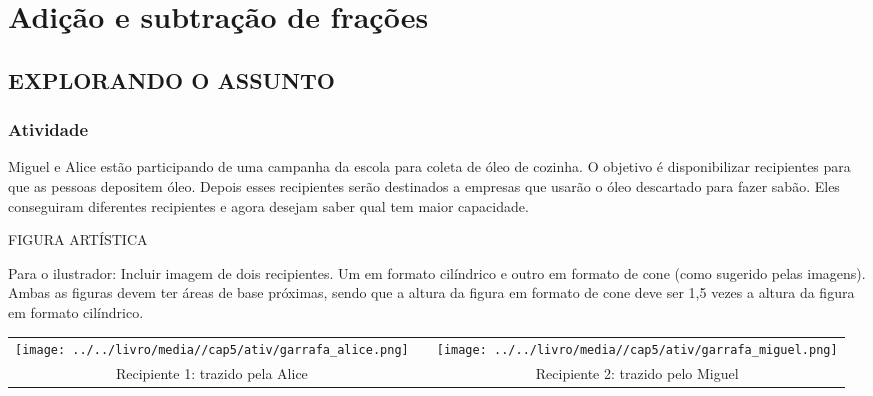 
\setcounter{chapter}{4}
\chapter{Adição e subtração de frações }

\section{EXPLORANDO O ASSUNTO }

\setcounter{subsection}{0}
\subsection{Atividade}


Miguel e Alice estão participando de uma campanha da escola para coleta de óleo de cozinha. O objetivo é disponibilizar recipientes para que as pessoas depositem óleo. Depois esses recipientes serão destinados a empresas que usarão o óleo descartado para fazer sabão. Eles conseguiram diferentes recipientes e agora desejam saber qual tem maior capacidade.

\begin{imagem*}[breakable]{}{}  

FIGURA ARTÍSTICA

Para o ilustrador: Incluir imagem de dois recipientes. Um em formato cilíndrico e outro em formato de cone (como sugerido pelas imagens). Ambas as figuras devem ter áreas de base próximas, sendo que a altura da figura em formato de cone deve ser 1,5 vezes a altura da figura em formato cilíndrico.

\begin{tabular}{ccc}
\texttt{[image: ../../livro/media//cap5/ativ/garrafa\_alice.png]} &\quad \quad&  \texttt{[image: ../../livro/media//cap5/ativ/garrafa\_miguel.png]}\\
Recipiente 1: trazido pela Alice & &Recipiente 2: trazido pelo Miguel 
\end{tabular} 
\end{imagem*}

